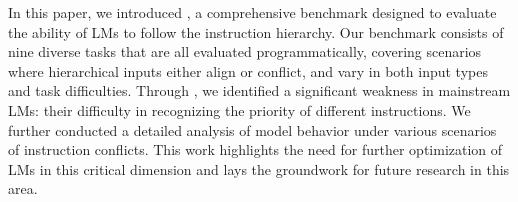 In this paper, we introduced \benchmark , a comprehensive benchmark designed to evaluate the ability of LMs to follow the instruction hierarchy. Our benchmark consists of nine diverse tasks that are all evaluated programmatically, covering scenarios where hierarchical inputs either align or conflict, and vary in both input types and task difficulties. Through \benchmark , we identified a significant weakness in mainstream LMs: their difficulty in recognizing the priority of different instructions. We further conducted a detailed analysis of model behavior under various scenarios of instruction conflicts. This work highlights the need for further optimization of LMs in this critical dimension and lays the groundwork for future research in this area.